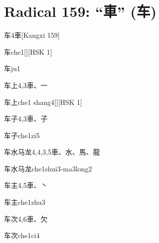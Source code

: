 
\section*{Radical 159: ``⾞'' (车)}

\begin{entry}{车}{4}{⾞}[Kangxi 159]
  \begin{phonetics}{车}{che1}[][HSK 1]
  \end{phonetics}
  \begin{phonetics}{车}{ju1}
  \end{phonetics}
\end{entry}

\begin{entry}{车上}{4,3}{⾞、⼀}
  \begin{phonetics}{车上}{che1 shang4}[][HSK 1]
  \end{phonetics}
\end{entry}

\begin{entry}{车子}{4,3}{⾞、⼦}
  \begin{phonetics}{车子}{che1zi5}
  \end{phonetics}
\end{entry}

\begin{entry}{车水马龙}{4,4,3,5}{⾞、⽔、⾺、⿓}
  \begin{phonetics}{车水马龙}{che1shui3-ma3long2}
  \end{phonetics}
\end{entry}

\begin{entry}{车主}{4,5}{⾞、⼂}
  \begin{phonetics}{车主}{che1zhu3}
  \end{phonetics}
\end{entry}

\begin{entry}{车次}{4,6}{⾞、⽋}
  \begin{phonetics}{车次}{che1ci4}
  \end{phonetics}
\end{entry}


